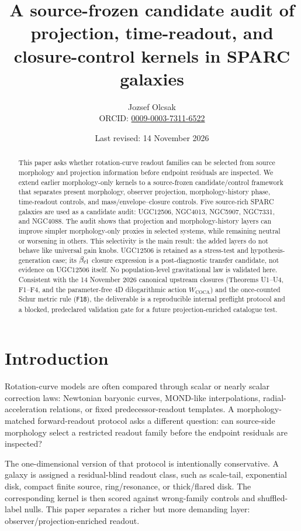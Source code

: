 \documentclass[11pt]{article}
\title{A source-frozen candidate audit of projection, time-readout, and
closure-control kernels in SPARC galaxies}
\author{Jozsef Olcsak\\{\small ORCID: \href{https://orcid.org/0009-0003-7311-6522}{0009-0003-7311-6522}}}
\date{Last revised: 14 November 2026}
\begin{document}
\maketitle

\begin{abstract}
This paper asks whether rotation-curve readout families can be selected from
source morphology and projection information before endpoint residuals are
inspected.  We extend earlier morphology-only kernels to a source-frozen
candidate/control framework that separates present morphology, observer
projection, morphology-history phase, time-readout controls, and
mass/envelope--closure controls.  Five source-rich SPARC galaxies are used as a
candidate audit: UGC12506, NGC4013, NGC5907, NGC7331, and NGC4088.  The audit
shows that projection and morphology-history layers can improve simpler
morphology-only proxies in selected systems, while remaining neutral or
worsening in others.  This selectivity is the main result: the added layers do
not behave like universal gain knobs.  UGC12506 is retained as a stress-test and
hypothesis-generation case; its \(\beta_{\rm cl}\) closure expression is a
post-diagnostic transfer candidate, not evidence on UGC12506 itself.  No
population-level gravitational law is validated here.  Consistent with the 14
November 2026 canonical upstream closures (Theorems U1--U4, F1--F4, and the
parameter-free 4D dilogarithmic action \(W_{\mathrm{COCA}}\)) and the
once-counted Schur metric rule (\texttt{F18}), the deliverable is a reproducible
internal preflight protocol and a blocked, predeclared validation gate for a
future projection-enriched catalogue test.
\end{abstract}

\section{Introduction}

Rotation-curve models are often compared through scalar or nearly scalar
correction laws: Newtonian baryonic curves, MOND-like interpolations,
radial-acceleration relations, or fixed predecessor-readout templates.  A
morphology-matched forward-readout protocol asks a different question: can
source-side morphology select a restricted readout family before the endpoint
residuals are inspected?

The one-dimensional version of that protocol is intentionally conservative.  A
galaxy is assigned a residual-blind readout class, such as scale-tail,
exponential disk, compact finite source, ring/resonance, or thick/flared disk.
The corresponding kernel is then scored against wrong-family controls and
shuffled-label nulls.  This paper separates a richer but more demanding layer:
observer/projection-enriched readout.
\end{document}
